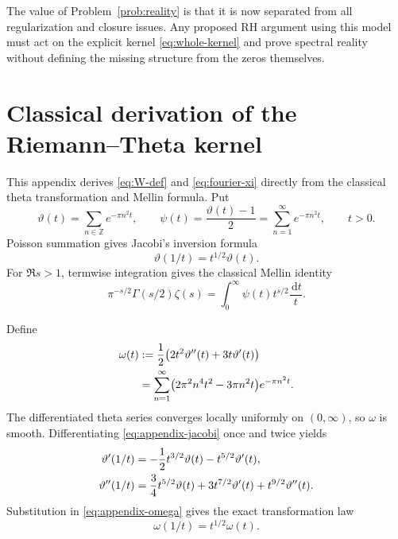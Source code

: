 \documentclass[11pt,reqno]{amsart}
\numberwithin{equation}{section}
\newcommand{\1}{\mathbf 1}
\newcommand{\dd}{\,\mathrm d}
\begin{document}
The value of Problem~\ref{prob:reality} is that it is now separated from all
regularization and closure issues.  Any proposed RH argument using this model
must act on the explicit kernel \eqref{eq:whole-kernel} and prove spectral
reality without defining the missing structure from the zeros themselves.

\appendix

\section{Classical derivation of the Riemann--Theta kernel}
\label{sec:appendix-kernel}

This appendix derives \eqref{eq:W-def} and \eqref{eq:fourier-xi} directly
from the classical theta transformation and Mellin formula.  Put
\begin{equation}\label{eq:appendix-theta-psi}
 \vartheta(t)=\sum_{n\in\mathbb Z}e^{-\pi n^2t},
 \qquad
 \psi(t)=\frac{\vartheta(t)-1}{2}
 =\sum_{n=1}^\infty e^{-\pi n^2t},
 \qquad t>0.
\end{equation}
Poisson summation gives Jacobi's inversion formula
\begin{equation}\label{eq:appendix-jacobi}
 \vartheta(1/t)=t^{1/2}\vartheta(t).
\end{equation}
For $\Re s>1$, termwise integration gives the classical Mellin identity
\begin{equation}\label{eq:appendix-mellin-zeta}
 \pi^{-s/2}\Gamma(s/2)\zeta(s)
 =\int_0^\infty \psi(t)t^{s/2}\frac{\dd t}{t}.
\end{equation}

Define
\begin{align}
 \omega(t)
 &:=\frac12\bigl(2t^2\vartheta''(t)+3t\vartheta'(t)\bigr)\notag\\
 &=\sum_{n=1}^\infty
 \bigl(2\pi^2n^4t^2-3\pi n^2t\bigr)e^{-\pi n^2t}.
 \label{eq:appendix-omega}
\end{align}
The differentiated theta series converges locally uniformly on $(0,\infty)$,
so $\omega$ is smooth.  Differentiating \eqref{eq:appendix-jacobi} once and
twice yields
\begin{align}
 \vartheta'(1/t)
 &=-\frac12t^{3/2}\vartheta(t)-t^{5/2}\vartheta'(t),\notag\\
 \vartheta''(1/t)
 &=\frac34t^{5/2}\vartheta(t)+3t^{7/2}\vartheta'(t)
   +t^{9/2}\vartheta''(t).
 \label{eq:appendix-theta-derivatives}
\end{align}
Substitution in \eqref{eq:appendix-omega} gives the exact transformation law
\begin{equation}\label{eq:appendix-omega-inversion}
 \omega(1/t)=t^{1/2}\omega(t).
\end{equation}
\end{document}
